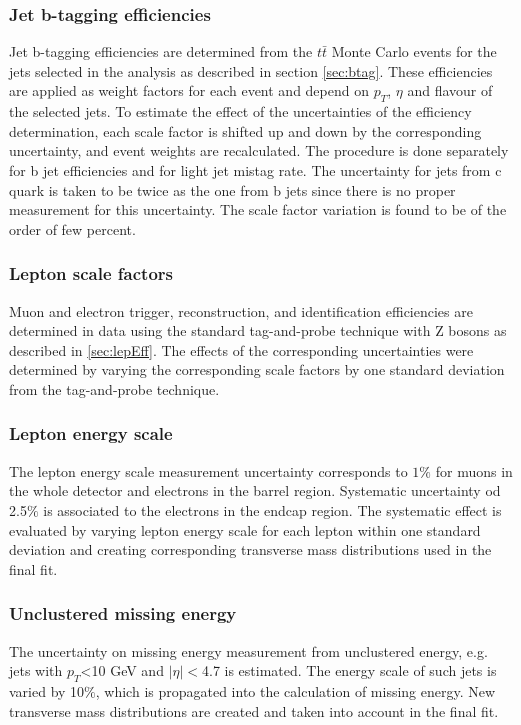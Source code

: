 \subsubsection*{Jet b-tagging efficiencies}
        Jet b-tagging efficiencies are determined from the $t\bar{t}$ Monte Carlo events for the jets selected in the analysis as described in section \ref{sec:btag}. These efficiencies are applied as weight factors for each event and depend on $p_T$, $\eta$ and flavour of the selected jets. To estimate the effect of the uncertainties of the efficiency determination, each scale factor is shifted up and down by the corresponding uncertainty, and event weights are recalculated. The procedure is done separately for b jet efficiencies and for light jet mistag rate. The uncertainty for jets from c quark is taken to be twice as the one from b jets since there is no proper measurement for this uncertainty. The scale factor variation is found to be of the order of few percent. 
\subsubsection*{Lepton scale factors}
        Muon and electron trigger, reconstruction, and identification efficiencies are determined in data using the standard tag-and-probe technique with Z bosons as described in \ref{sec:lepEff}. The effects of the corresponding uncertainties were determined by varying the corresponding scale factors by one standard deviation from the tag-and-probe technique. 
\subsubsection*{Lepton energy scale} 
		The lepton energy scale measurement uncertainty corresponds to $1\%$ for muons in the whole detector and electrons in the barrel region. Systematic uncertainty od 2.5$\%$ is associated to the electrons in the endcap region. The systematic effect is evaluated by varying lepton energy scale for each lepton within one standard deviation and creating corresponding transverse mass distributions used in the final fit.
\subsubsection*{Unclustered missing energy}
        The uncertainty on missing energy measurement from unclustered energy, e.g. jets with $p_T$<10 GeV and $|\eta|<$4.7 is estimated. The energy scale of such jets is varied by 10$\%$, which is propagated into the calculation of missing energy. New transverse mass distributions are created and taken into account in the final fit.
